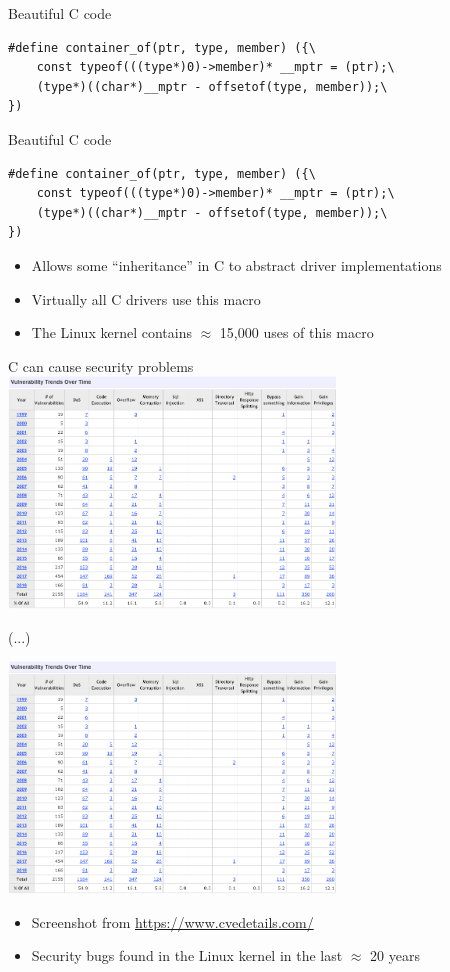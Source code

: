 \documentclass[NET,english,aspectratio=169,notitleframe]{tumbeamer}
\begin{document}
\begin{frame}[fragile]{Beautiful C code}
\begin{verbatim}
#define container_of(ptr, type, member) ({\
	const typeof(((type*)0)->member)* __mptr = (ptr);\
	(type*)((char*)__mptr - offsetof(type, member));\
})
\end{verbatim}
\end{frame}


\begin{frame}[fragile]{Beautiful C code}
\begin{verbatim}
#define container_of(ptr, type, member) ({\
	const typeof(((type*)0)->member)* __mptr = (ptr);\
	(type*)((char*)__mptr - offsetof(type, member));\
})
\end{verbatim}
\begin{itemize}
\item Allows some ``inheritance'' in C to abstract driver implementations
\item Virtually all C drivers use this macro
\item The Linux kernel contains $\approx$ 15,000 uses of this macro
\end{itemize}
\end{frame}

\begin{frame}{C can cause security problems}
\centering\includegraphics[trim={0 13cm 0 0},clip,width=0.65\textwidth]{pics/cve}

\footnotesize (...)

\centering\includegraphics[trim={0 0 0 17.5cm},clip,width=0.65\textwidth]{pics/cve}

\begin{itemize}
\item Screenshot from \url{https://www.cvedetails.com/}
\item Security bugs found in the Linux kernel in the last $\approx$ 20 years
\end{itemize}

\end{frame}
\end{document}
